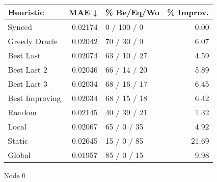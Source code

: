 \begin{tabular}{lrlr}
\toprule
\textbf{Heuristic} & \textbf{MAE ↓} & \textbf{\% Be/Eq/Wo} & \textbf{\% Improv.} \\
\midrule
            Synced &        0.02174 &          0 / 100 / 0 &                0.00 \\
     Greedy Oracle &        0.02042 &          70 / 30 / 0 &                6.07 \\
         Best Last &        0.02074 &         63 / 10 / 27 &                4.59 \\
       Best Last 2 &        0.02046 &         66 / 14 / 20 &                5.89 \\
       Best Last 3 &        0.02034 &         68 / 16 / 17 &                6.45 \\
    Best Improving &        0.02034 &         68 / 15 / 18 &                6.42 \\
            Random &        0.02145 &         40 / 39 / 21 &                1.32 \\
             Local &        0.02067 &          65 / 0 / 35 &                4.92 \\
            Static &        0.02645 &          15 / 0 / 85 &              -21.69 \\
            Global &        0.01957 &          85 / 0 / 15 &                9.98 \\
\bottomrule
\end{tabular}
\caption{Node 0}
\label{tab:iid_lr01_le1_bs4_0}
